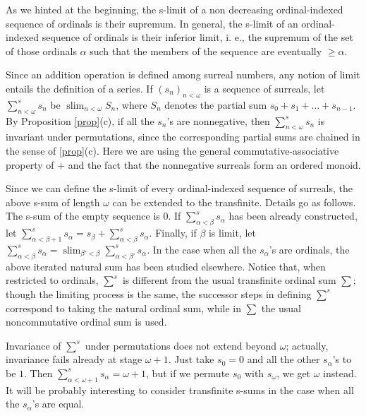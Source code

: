 \documentclass[12pt]{amsart}
\theoremstyle{definition}
\theoremstyle{remark}
\begin{document}
As we hinted at the beginning,
the s-limit of a non decreasing ordinal-indexed sequence
of ordinals is their supremum. In general, 
the s-limit of an ordinal-indexed sequence of ordinals is
their inferior limit, i. e., 
the supremum of the set of  those ordinals $\alpha$ such that 
the  members of the sequence 
 are eventually $\geq \alpha$.

Since an addition operation is defined among 
 surreal numbers, any notion of limit
entails the definition of a series.
If $( s _n ) _{ n < \omega } $  is a sequence of surreals,
 let $\sum^s _{n < \omega } s_n$ be
 $\operatorname{slim}_{n < \omega } S_n$,
where  $S_n$ denotes the partial sum
$s_0 + s_1 + \dots + s _{n-1} $.   
By Proposition \ref{prop}(c), 
if all the $s_n$'s are nonnegative, then  
$\sum^s _{n < \omega } s_n$ is invariant under permutations,
since the corresponding partial sums are chained in the sense of
\ref{prop}(c).  
Here we are using the general commutative-associative property 
of $+$ and the fact that the nonnegative surreals 
form an ordered monoid.

Since
  we can define the s-limit 
of every ordinal-indexed sequence of surreals, the above
 s-sum of length $ \omega$ can be extended to the transfinite.
Details go as follows.
The s-sum of the empty sequence is $0$.
If $\sum^s _{ \alpha < \beta  } s_ \alpha $
has been already constructed, let 
 $\sum^s _{ \alpha < \beta +1  } s_ \alpha 
= s _{ \beta} + \sum^s _{ \alpha < \beta  } s_ \alpha $.
Finally, if
$\beta$ is limit, let
 $\sum^s _{ \alpha < \beta  } s_ \alpha 
= \operatorname{slim} _{ \beta' < \beta }  \sum^s _{ \alpha < \beta'  } s_ \alpha $.
In the case when all the $s_ \alpha $'s
are ordinals, 
 the above iterated natural sum has been studied elsewhere.
Notice that, when restricted to ordinals, $\sum^s$ is different from the usual
transfinite ordinal sum $\sum$; though the limiting process is the same,
the successor steps in defining $\sum^s$ 
correspond to taking the natural ordinal sum, while in $\sum$
the usual noncommutative ordinal sum is used.

Invariance of  $\sum^s $ under permutations
does not extend beyond $ \omega$; actually, invariance fails already
at stage $ \omega+1$. Just take $s_0=0$
and all the other $s_ \alpha $'s to be $1$. Then
$\sum^s _{ \alpha < \omega +1 } s_ \alpha = \omega +1$,
but if we permute $s_0$ with $s_ \omega $, we get
$ \omega$ instead. 
It will be probably interesting to consider transfinite s-sums
 in the case when all the $s_ \alpha $'s are equal. 
\end{document}
